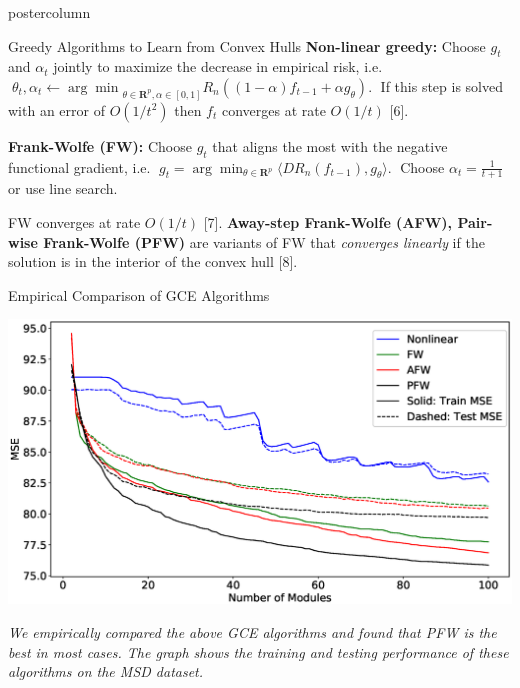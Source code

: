 \documentclass{beamer}
\newcommand{\realnum}{{\mathbf R}}
\newcommand{\argmin}{{\arg\min}}
\newcommand{\funcgrad}{D}
\begin{document}
\begin{frame}
\begin{columns}
\begin{column}{.37\textwidth}
\begin{beamercolorbox}[center]{postercolumn}
\begin{minipage}{.98\textwidth}
{\begin{myblock}{Greedy Algorithms to Learn from Convex Hulls}
\vspace{0.3em}
{\color{blue}\textbf{Non-linear greedy:}} Choose $g_{t}$ and $\alpha_{t}$ jointly to maximize the decrease in empirical risk, i.e. $\; \theta_{t}, \alpha_{t}  \gets \argmin_{\theta \in \realnum^{p}, \alpha \in [0, 1]} R_{n}((1 - \alpha) f_{t-1} + \alpha g_{\theta}).\;$
If this step is solved with an error of $O(1/t^2)$ then $f_t$ converges at rate $O(1/t)$ [6].

\vspace{0.3em}
{\color{blue}\textbf{Frank-Wolfe (FW):}} Choose $g_t$ that aligns the most with the negative functional gradient, i.e.  $\; g_{t} = \arg\min_{\theta \in \realnum^p} \langle \funcgrad R_{n}(f_{t-1}), g_\theta \rangle.\;$ Choose $\alpha_{t} = \frac{1}{t+1}$ or use line search.  

\vspace{0.3em}
FW  converges at rate $O(1/t)$ [7].
\textbf{Away-step Frank-Wolfe ({\color{blue}AFW}), Pair-wise Frank-Wolfe ({\color{blue}PFW})} are variants of FW that \emph{converges linearly} if the solution is in the interior of the convex hull [8].


\end{myblock}\vfill

\vspace{-0.2ex}
\begin{myblock}{Empirical Comparison of GCE Algorithms}

\begin{minipage}{0.55\textwidth}
    \includegraphics[clip, trim=2cm 1cm 2.5cm 1.5cm, width=\textwidth]{nips_greedy_algs_msd}
\end{minipage}
\begin{minipage}{0.41\textwidth}
\vspace{-1.3ex}
\emph{We empirically compared the above GCE algorithms and found that \emph{PFW is the best in most cases}. The graph shows the training and testing performance of these algorithms on the MSD dataset.}
\end{minipage}


\end{myblock}}
\end{minipage}
\end{beamercolorbox}
\end{column}
\end{columns}
\end{frame}
\end{document}
